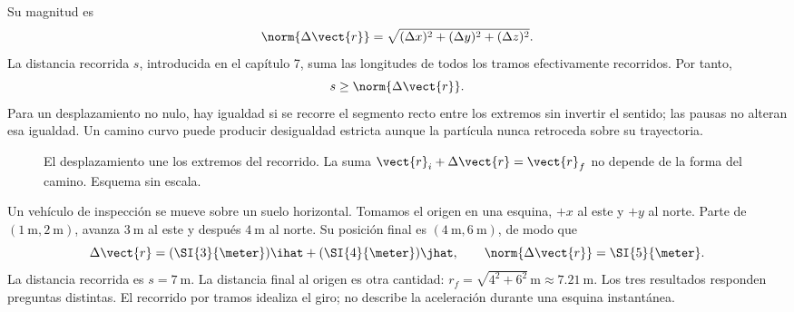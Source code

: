 Su magnitud es
\[ \norm{\Delta\vect{r}}=\sqrt{(\Delta x)^2+(\Delta y)^2+(\Delta z)^2}. \]
La distancia recorrida \(s\), introducida en el capítulo 7, suma las
longitudes de todos los tramos efectivamente recorridos. Por tanto,
\[ s\geq\norm{\Delta\vect{r}}. \]
Para un desplazamiento no nulo, hay igualdad si se recorre el segmento recto
entre los extremos sin invertir el sentido; las pausas no alteran esa
igualdad. Un camino curvo puede producir desigualdad estricta aunque la
partícula nunca retroceda sobre su trayectoria.

\begin{figure}[htbp]
    \centering
    \caption{El desplazamiento une los extremos del recorrido.
    La suma \(\vect{r}_i+\Delta\vect{r}=\vect{r}_f\) no depende
    de la forma del camino. Esquema sin escala.}
\end{figure}

\begin{ejemplo}
Un vehículo de inspección se mueve sobre un suelo horizontal. Tomamos
el origen en una esquina, \(+x\) al este y \(+y\) al norte.
Parte de \((\SI{1}{\meter},\SI{2}{\meter})\), avanza \(\SI{3}{\meter}\)
al este y después \(\SI{4}{\meter}\) al norte. Su posición final es
\((\SI{4}{\meter},\SI{6}{\meter})\), de modo que
\[ \Delta\vect{r}=(\SI{3}{\meter})\ihat+(\SI{4}{\meter})\jhat,
\qquad \norm{\Delta\vect{r}}=\SI{5}{\meter}. \]
La distancia recorrida es \(s=\SI{7}{\meter}\). La distancia final al origen
es otra cantidad: \(r_f=\sqrt{4^2+6^2}\,\si{\meter}\approx\SI{7.21}{\meter}\).
Los tres resultados responden preguntas distintas. El recorrido por tramos
idealiza el giro; no describe la aceleración durante una esquina instantánea.
\end{ejemplo}

